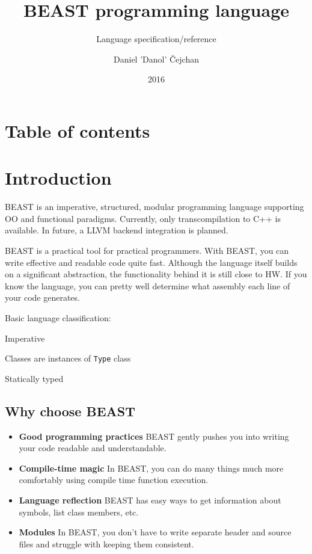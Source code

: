 




\setlength\extrarowheight{2pt}

\title{BEAST programming language}
\subtitle{Language specification/reference}
\author{Daniel 'Danol' Čejchan}
\date{2016}



\mainpage

\chapter{Table of contents}
\makeatletter
\setcounter{tocdepth}{1}
\makeatother

\chapter{Introduction}
BEAST is an imperative, structured, modular programming language supporting OO and functional paradigms. Currently, only transcompilation to C++ is available. In future, a LLVM backend integration is planned.

BEAST is a practical tool for practical programmers. With BEAST, you can write effective and readable code quite fast. Although the language itself builds on a significant abstraction, the functionality behind it is still close to HW. If you know the language, you can pretty well determine what assembly each line of your code generates.

Basic language classification:
\begin{compactitem}
	\item Imperative
	\item Classes are instances of \verb|Type| class
	\item Statically typed
\end{compactitem}

\section{Why choose BEAST}
\begin{itemize}
	\item \textbf{Good programming practices} BEAST gently pushes you into writing your code readable and understandable.
	\item \textbf{Compile-time magic} In BEAST, you can do many things much more comfortably using compile time function execution.
	\item \textbf{Language reflection} BEAST has easy ways to get information about symbols, list class members, etc.
	\item \textbf{Modules} In BEAST, you don't have to write separate header and source files and struggle with keeping them consistent.
\end{itemize}

